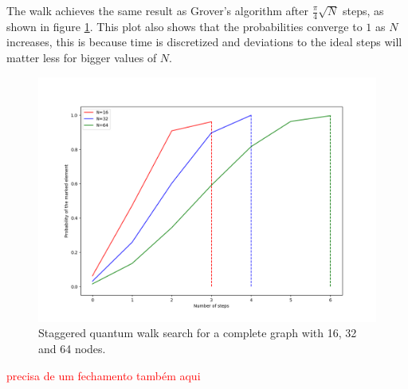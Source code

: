                 The walk achieves the same result as Grover's algorithm after $\frac{\pi}{4}\sqrt{N}$ steps, as shown in figure \ref{fig:StagSearch}. This plot also shows that the probabilities converge to $1$ as $N$ increases, this is because time is discretized and deviations to the ideal steps will matter less for bigger values of $N$.
            	\begin{figure}[!h]
                    \centering
                    \includegraphics[scale=0.40]{img/StagQW/search/163264.png}
                     \caption{Staggered quantum walk search for a complete graph with 16, 32 and 64 nodes.}\label{fig:StagSearch}
                \end{figure}
                
               
               \textcolor{red}{precisa de um fechamento também aqui}
                
